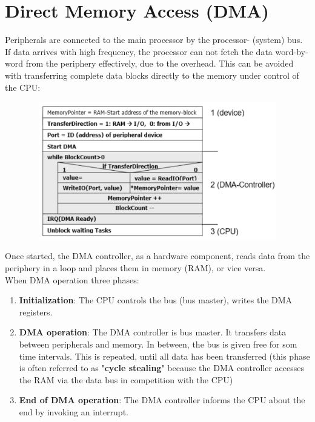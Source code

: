 \section{Direct Memory Access (DMA)}

Peripherals are connected to the main processor by the processor- (system) bus. If data arrives with high frequency, the processor can not fetch the data word-by-word from the periphery effectively, due to the overhead. This can be avoided with transferring complete data blocks directly to the memory under control of the CPU:\\

    \begin{figure}[h]
    \centering
    \includegraphics[width=12cm, height=6cm]{Images/image181.png}
    \label{fig:Fig 140}
    \end{figure}

Once started, the DMA controller, as a hardware component, reads data from the periphery in a loop and places them in memory (RAM), or vice versa.\\

When DMA operation three phases:

\begin{enumerate}
\item  \textbf{Initialization}: The CPU controls the bus (bus master), writes the DMA registers.
\item  \textbf{DMA operation}: The DMA controller is bus master. It transfers data between peripherals and memory. In between, the bus is given free for som time intervals. This is repeated, until all data has been transferred (this phase is often referred to as "\textbf{cycle stealing}" because the DMA controller accesses the RAM via the data bus in competition with the CPU)
\item  \textbf{End of DMA operation}: The DMA controller informs the CPU about the end by invoking an interrupt.
\end{enumerate}

